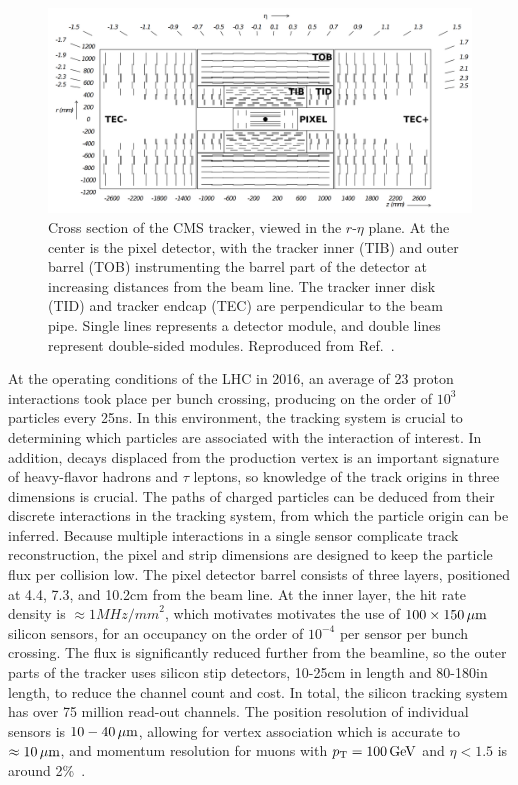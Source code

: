 \begin{figure}[htbp]
  \centering
   \includegraphics[width=\textwidth]{figures/LHCandCMS/trackerCrossSection.png}
  \caption{
    Cross section of the CMS tracker, viewed in the $r$-$\eta$ plane.
    At the center is the pixel detector, with the tracker inner (TIB) and
    outer barrel (TOB) instrumenting the barrel part of the detector
    at increasing distances from the beam line. The tracker inner disk (TID)
    and tracker endcap (TEC) are perpendicular to the beam pipe.
    Single lines represents a detector module, and double lines represent
    double-sided modules. Reproduced from Ref.~\cite{Chatrchyan:2009aa}.
        }
 \label{fig:trackerCrossSec}
\end{figure}

At the operating conditions of the LHC in 2016, an average of 23 proton
interactions took place per bunch crossing, producing on the order of $10^{3}$ particles
every 25\unit{ns}.
In this environment, the tracking system is crucial to determining which particles are associated
with the interaction of interest. In addition, decays displaced from the
production vertex is an important signature of heavy-flavor hadrons and $\tau$ leptons,
so knowledge of the track origins in three dimensions is crucial.
The paths of charged particles can be deduced from their discrete interactions
in the tracking system, from which the particle origin can be inferred.
Because multiple interactions in a single sensor complicate track reconstruction, the pixel and strip 
dimensions are designed to keep the particle flux per collision low.
The pixel detector barrel consists of three layers, positioned at 4.4, 7.3, and
10.2\unit{cm} from the beam line. At the inner layer,
the hit rate density is $\approx1\unit{MHz/mm}^2$, which motivates 
motivates the use of $100\times150\,\mu\text{m}$ silicon sensors, for an occupancy
on the order of $10^{-4}$ per sensor per bunch crossing. The flux is significantly
reduced further from the beamline, so the outer parts of the tracker uses silicon
stip detectors, 10-25\unit{cm} in length and 80-180\micron in length, to reduce
the channel count and cost. In total, the silicon tracking system has over 75 million read-out channels.
The position resolution of individual sensors is $10-40\,\mu\text{m}$,
allowing for vertex association which is accurate to $\approx10\,\mu\text{m}$, 
and momentum resolution for muons with $p_{\mathrm{T}} = 100\,\text{Ge\hspace{-.08em}V}$
and $\eta < 1.5$ is around 2\%~\cite{Chatrchyan:2014fea}.

